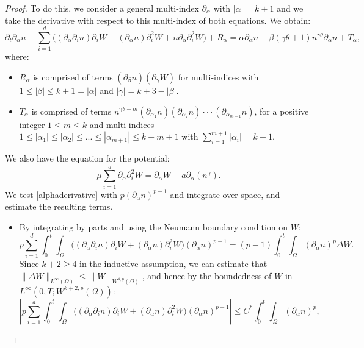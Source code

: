 \documentclass[12pt]{article}
\theoremstyle{plain}
\begin{document}
\begin{proof}
To do this, we consider a general multi-index $\partial_{\alpha}$ with $|\alpha| = k + 1$ and we take the derivative with respect to this multi-index of both equations. We obtain:
\begin{equation}\label{alphaderivative}
\partial_{t}\partial_{\alpha} n - \sum_{i = 1}^{d} \Big((\partial_{\alpha} \partial_{i} n) \partial_{i}W + (\partial_{\alpha} n) \partial_{i}^{2} W + n\partial_{\alpha} \partial^{2}_{i}W\Big) + R_{\alpha} = \alpha \partial_{\alpha}n - \beta(\gamma \theta + 1)n^{\gamma \theta} \partial_{\alpha} n + T_{\alpha},
\end{equation}
where:
\begin{itemize}
    \item $R_{\alpha}$ is comprised of terms $(\partial_{\beta} n)(\partial_{\gamma} W)$ for multi-indices with $1 \le |\beta| \le k + 1 = |\alpha|$ and $|\gamma| = k + 3 - |\beta|$.
    \item $T_{\alpha}$ is comprised of terms $n^{\gamma \theta - m} (\partial_{\alpha_{1}}n) (\partial_{\alpha_{2}}n) \cdot \cdot \cdot (\partial_{\alpha_{m+1}}n)$, for a positive integer $1 \le m \le k$ and multi-indices $1 \le |\alpha_{1}| \le |\alpha_{2}| \le ... \le |\alpha_{m+1}| \le k - m + 1$ with $\displaystyle \sum_{i = 1}^{m+1} |\alpha_{i}| = k + 1$.
\end{itemize}
We also have the equation for the potential:
\begin{equation}\label{Winductive}
\mu \sum_{i = 1}^{d} \partial_{\alpha} \partial^{2}_{i}W = \partial_{\alpha} W - a \partial_{\alpha} (n^{\gamma}).
\end{equation}
We test \eqref{alphaderivative} with $p(\partial_{\alpha}n)^{p - 1}$ and integrate over space, and estimate the resulting terms.
\begin{itemize}
\item By integrating by parts and using the Neumann boundary condition on $W$:
\begin{equation*}
p\sum_{i = 1}^{d} \int_{0}^{t} \int_{\Omega} \Big((\partial_{\alpha} \partial_{i}n) \partial_{i}W + (\partial_{\alpha} n)\partial^{2}_{i}W\Big) (\partial_{\alpha} n)^{p - 1} = (p - 1)\int_{0}^{t} \int_{\Omega} (\partial_{\alpha} n)^{p} \Delta W. 
\end{equation*}
Since $k + 2 \ge 4$ in the inductive assumption, we can estimate that $\|\Delta W\|_{L^{\infty}(\Omega)} \le \|W\|_{W^{4, p}(\Omega)}$, and hence by the boundedness of $W$ in $L^{\infty}(0, T; W^{k + 2, p}(\Omega))$:
\begin{equation*}
\left|p\sum_{i = 1}^{d} \int_{0}^{t} \int_{\Omega} \Big((\partial_{\alpha} \partial_{i}n) \partial_{i}W + (\partial_{\alpha}n)\partial^{2}_{i}W\Big) (\partial_{\alpha}n)^{p - 1}\right| \le C^{*}\int_{0}^{t} \int_{\Omega} (\partial_{\alpha}n)^{p},

\end{equation*}
\end{itemize}
\end{proof}
\end{document}

